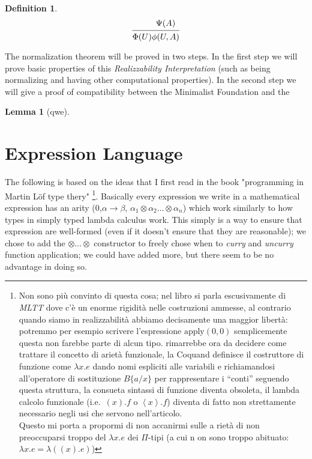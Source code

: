 \documentclass[11pt,a5paper,draft,oneside]{amsbook}
\theoremstyle{plain}%
\newtheorem{lem}[thm]{Lemma}
\theoremstyle{definition}
\newtheorem{dede}{Definition}[section]
\theoremstyle{remark}
\begin{document}
\begin{dede}
	\begin{gather}
	\begin{prooftree}
	\Hypo{\phantom{\Psi(A)}}
	\Infer1{\Phi(U)}
	\end{prooftree}
	\begin{prooftree}
	\Hypo{\Psi(A)}
	\Infer1{\phi(U,A)}
	\end{prooftree}	
	\end{gather}	
	
	\end{dede}
	
	The normalization theorem will be proved in two steps. In the first step we will prove basic properties of this \emph{Realizzability Interpretation} (such as being normalizing and having other computational properties). In the second step we will give a proof of compatibility between the Minimalist Foundation and the 
	
 	
	\begin{lem}[qwe]
	
	\end{lem}
\chapter{Expression Language}
	The following is based on the ideas that I first read in the book "programming in Martin Löf type thery" 
	\footnote{\label{qwe13}Non sono più convinto di questa cosa; nel libro si parla escusivamente di \emph{MLTT} dove c'è un enorme rigidità nelle costruzioni ammesse, al contrario quando siamo in realizzabilità abbiamo decisamente una maggior libertà: potremmo per esempio scrivere l'espressione $\text{apply}(0,0)$ semplicemente questa non farebbe parte di alcun tipo.
	rimarrebbe ora da decidere come trattare il concetto di arietà funzionale, la Coquand definisce il costruttore di funzione come $\lambda x . e$ dando nomi espliciti alle variabili e richiamandosi all'operatore di sostituzione $B\{a/x\}$ per rappresentare i ``conti'' seguendo questa struttura, la consueta sintassi di funzione diventa obsoleta, il lambda calcolo funzionale (i.e.\ $(x).f$ o $\left\langle x\right\rangle.f$) diventa di fatto non strettamente necessario negli usi che servono nell'articolo. \\
	Questo mi porta a propormi di non accanirmi sulle a
	rietà di non preoccuparsi troppo del $\lambda x.e$ dei $\Pi$-tipi (a cui n
	on sono troppo abituato: $\lambda x.e 
	= \lambda ((x).e)$) 
	}. 
	Basically every expression we write in a mathematical expression has an arity (0,$\alpha\rightarrow\beta$, $\alpha_1\otimes\alpha_2\ldots\otimes\alpha_n$) which work similarly to how types in simply typed lambda calculus work. 
	This simply is a way to ensure that expression are well-formed (even if it doesn't ensure that they are reasonable); we chose to add the $\otimes\ldots\otimes$ constructor to freely chose when to \emph{curry} and \emph{uncurry} function application; we could have added more, but there seem to be no advantage in doing so.
	
\end{document}
